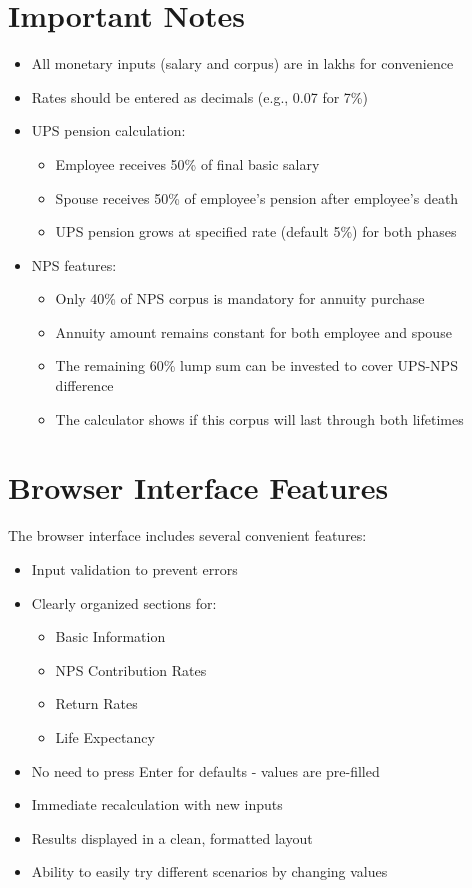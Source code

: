 \documentclass{article}
\begin{document}
\section{Important Notes}
\begin{itemize}
    \item All monetary inputs (salary and corpus) are in lakhs for convenience
    \item Rates should be entered as decimals (e.g., 0.07 for 7\%)
    \item UPS pension calculation:
    \begin{itemize}
        \item Employee receives 50\% of final basic salary
        \item Spouse receives 50\% of employee's pension after employee's death
        \item UPS pension grows at specified rate (default 5\%) for both phases
    \end{itemize}
    \item NPS features:
    \begin{itemize}
        \item Only 40\% of NPS corpus is mandatory for annuity purchase
        \item Annuity amount remains constant for both employee and spouse
        \item The remaining 60\% lump sum can be invested to cover UPS-NPS difference
        \item The calculator shows if this corpus will last through both lifetimes
    \end{itemize}
\end{itemize}

\section{Browser Interface Features}
The browser interface includes several convenient features:
\begin{itemize}
    \item Input validation to prevent errors
    \item Clearly organized sections for:
    \begin{itemize}
        \item Basic Information
        \item NPS Contribution Rates
        \item Return Rates
        \item Life Expectancy
    \end{itemize}
    \item No need to press Enter for defaults - values are pre-filled
    \item Immediate recalculation with new inputs
    \item Results displayed in a clean, formatted layout
    \item Ability to easily try different scenarios by changing values
\end{itemize}
\end{document}
